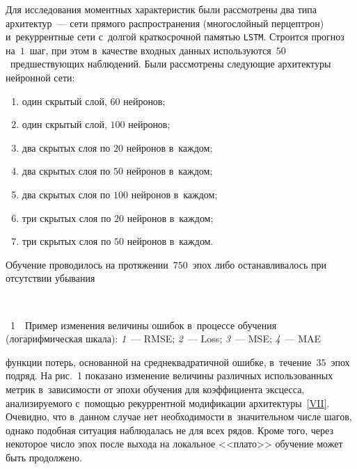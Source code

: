\begin{multicols}{2}
Для исследования моментных характеристик были рассмотрены два типа архитектур~--- 
сети прямого распространения (многослойный перцептрон) и~рекуррентные сети с~долгой 
краткосрочной памятью \verb"LSTM". Строится прогноз на~$1$~шаг, при этом в~качестве 
входных данных используются~$50$~предшествующих наблюдений. Были рассмотрены 
сле\-ду\-ющие архитектуры нейронной сети:
\begin{enumerate}[I:] %
\item \label{I} один скрытый слой, $60$ нейронов;
\item \label{II} один скрытый слой, $100$ нейронов;
\item \label{III} два скрытых слоя по $20$ нейронов в~каждом;
\item \label{IV} два скрытых слоя по $50$ нейронов в~каждом;
\item \label{V} два скрытых слоя по $100$ нейронов в~каждом;
\item \label{VI} три скрытых слоя по $20$ нейронов в~каждом;
\item \label{VII} три скрытых слоя по $50$ нейронов в~каждом.
\end{enumerate}

Обучение проводилось на протяжении~$750$~эпох либо останавливалось 
при отсутствии убывания\linebreak\vspace*{-12pt}

  { \begin{center}  %
 \vspace*{-4pt}
   \mbox{%
 \epsfxsize=79mm 
 }


\end{center}


\noindent
{{\figurename~1}\ \ \small{Пример изменения величины ошибок в~процессе обучения
 (логарифмическая шкала): \textit{1}~--- RMSE; \textit{2}~--- Loss; \textit{3}~--- MSE;
 \textit{4}~--- MAE}}
}

\vspace*{11pt}

\addtocounter{figure}{1}


\noindent
 функции потерь, основанной на среднеквадратичной ошибке, 
в~течение~$35$~эпох подряд. На рис.~1 показано изменение 
величины различных использованных метрик в~зависимости от 
эпохи обучения для коэффициента эксцесса, анализируемого с~помощью 
рекуррентной модификации архитектуры~\ref{VII}. Очевидно, что в~данном случае 
нет необходимости в~значительном числе шагов, однако подобная ситуация наблюдалась 
не для всех рядов. Кроме того, через некоторое число эпох после выхода на 
локальное <<плато>> обучение может быть продолжено.




\end{multicols}

